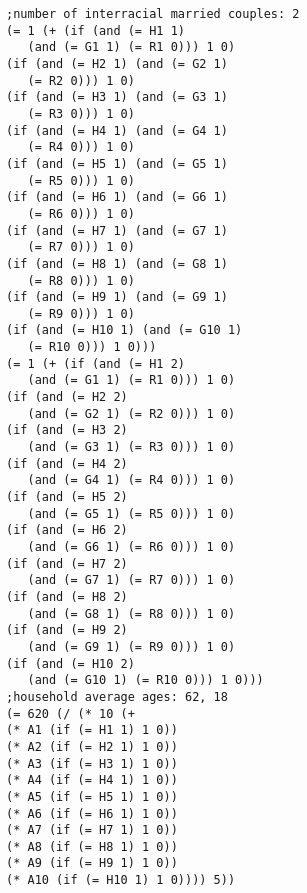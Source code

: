 \documentclass[runningheads]{llncs}
\begin{document}
\begin{verbatim}
;number of interracial married couples: 2
(= 1 (+ (if (and (= H1 1)
   (and (= G1 1) (= R1 0))) 1 0)
(if (and (= H2 1) (and (= G2 1)
   (= R2 0))) 1 0)
(if (and (= H3 1) (and (= G3 1)
   (= R3 0))) 1 0)
(if (and (= H4 1) (and (= G4 1)
   (= R4 0))) 1 0)
(if (and (= H5 1) (and (= G5 1)
   (= R5 0))) 1 0)
(if (and (= H6 1) (and (= G6 1)
   (= R6 0))) 1 0)
(if (and (= H7 1) (and (= G7 1)
   (= R7 0))) 1 0)
(if (and (= H8 1) (and (= G8 1)
   (= R8 0))) 1 0)
(if (and (= H9 1) (and (= G9 1)
   (= R9 0))) 1 0)
(if (and (= H10 1) (and (= G10 1)
   (= R10 0))) 1 0)))
(= 1 (+ (if (and (= H1 2)
   (and (= G1 1) (= R1 0))) 1 0)
(if (and (= H2 2)
   (and (= G2 1) (= R2 0))) 1 0)
(if (and (= H3 2)
   (and (= G3 1) (= R3 0))) 1 0)
(if (and (= H4 2)
   (and (= G4 1) (= R4 0))) 1 0)
(if (and (= H5 2)
   (and (= G5 1) (= R5 0))) 1 0)
(if (and (= H6 2)
   (and (= G6 1) (= R6 0))) 1 0)
(if (and (= H7 2)
   (and (= G7 1) (= R7 0))) 1 0)
(if (and (= H8 2)
   (and (= G8 1) (= R8 0))) 1 0)
(if (and (= H9 2)
   (and (= G9 1) (= R9 0))) 1 0)
(if (and (= H10 2)
   (and (= G10 1) (= R10 0))) 1 0)))
;household average ages: 62, 18
(= 620 (/ (* 10 (+
(* A1 (if (= H1 1) 1 0))
(* A2 (if (= H2 1) 1 0))
(* A3 (if (= H3 1) 1 0))
(* A4 (if (= H4 1) 1 0))
(* A5 (if (= H5 1) 1 0))
(* A6 (if (= H6 1) 1 0))
(* A7 (if (= H7 1) 1 0))
(* A8 (if (= H8 1) 1 0))
(* A9 (if (= H9 1) 1 0))
(* A10 (if (= H10 1) 1 0)))) 5))

\end{verbatim}
\end{document}

